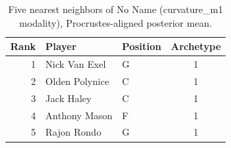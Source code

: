 \begin{table}[htbp]
  \centering\small
  \begin{tabular}{rllc}
    \toprule
    Rank & Player & Position & Archetype \\
    \midrule
    1 & Nick Van Exel & G & 1 \\
    2 & Olden Polynice & C & 1 \\
    3 & Jack Haley & C & 1 \\
    4 & Anthony Mason & F & 1 \\
    5 & Rajon Rondo & G & 1 \\
    \bottomrule
  \end{tabular}
  \caption{Five nearest neighbors of No Name (curvature_m1 modality), Procrustes-aligned posterior mean.}
  \label{tab:No_Name_neighbors_curvature_m1}
\end{table}

